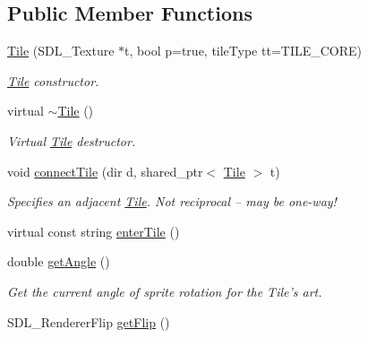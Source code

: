 \subsection*{Public Member Functions}
\begin{DoxyCompactItemize}
\item 
\hyperlink{class_tile_a9a76de53ca5def42bfd047dd9d97fa4e}{Tile} (S\+D\+L\+\_\+\+Texture $\ast$t, bool p=true, tile\+Type tt=T\+I\+L\+E\+\_\+\+C\+O\+RE)\hypertarget{class_tile_a9a76de53ca5def42bfd047dd9d97fa4e}{}\label{class_tile_a9a76de53ca5def42bfd047dd9d97fa4e}

\begin{DoxyCompactList}\small\item\em \hyperlink{class_tile}{Tile} constructor. \end{DoxyCompactList}\item 
virtual \hyperlink{class_tile_a98634abbd93fa13d0578d7103202d03d}{$\sim$\+Tile} ()\hypertarget{class_tile_a98634abbd93fa13d0578d7103202d03d}{}\label{class_tile_a98634abbd93fa13d0578d7103202d03d}

\begin{DoxyCompactList}\small\item\em Virtual \hyperlink{class_tile}{Tile} destructor. \end{DoxyCompactList}\item 
void \hyperlink{class_tile_a211578d3919d82229a23197a4467b099}{connect\+Tile} (dir d, shared\+\_\+ptr$<$ \hyperlink{class_tile}{Tile} $>$ t)\hypertarget{class_tile_a211578d3919d82229a23197a4467b099}{}\label{class_tile_a211578d3919d82229a23197a4467b099}

\begin{DoxyCompactList}\small\item\em Specifies an adjacent \hyperlink{class_tile}{Tile}. Not reciprocal -- may be one-\/way! \end{DoxyCompactList}\item 
virtual const string \hyperlink{class_tile_ae04dfcac010592c1ef0aaae031f31b6a}{enter\+Tile} ()
\item 
double \hyperlink{class_tile_a947b6692bfcdd7b1adc59fcbee16c1fc}{get\+Angle} ()\hypertarget{class_tile_a947b6692bfcdd7b1adc59fcbee16c1fc}{}\label{class_tile_a947b6692bfcdd7b1adc59fcbee16c1fc}

\begin{DoxyCompactList}\small\item\em Get the current angle of sprite rotation for the Tile’s art. \end{DoxyCompactList}\item 
S\+D\+L\+\_\+\+Renderer\+Flip \hyperlink{class_tile_ad2d2b3bd012d3a54ccb51f6eb986115a}{get\+Flip} ()\hypertarget{class_tile_ad2d2b3bd012d3a54ccb51f6eb986115a}{}\label{class_tile_ad2d2b3bd012d3a54ccb51f6eb986115a}


\end{DoxyCompactItemize}

